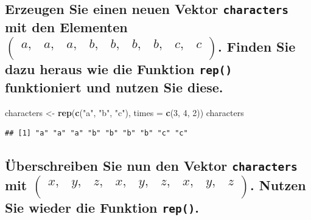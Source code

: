 \documentclass[12pt,a4paper]{article}
\newenvironment{Shaded}{\begin{snugshade}}{\end{snugshade}}
\newcommand{\AttributeTok}[1]{\textcolor[rgb]{0.13,0.29,0.53}{#1}}
\newcommand{\DecValTok}[1]{\textcolor[rgb]{0.00,0.00,0.81}{#1}}
\newcommand{\FunctionTok}[1]{\textcolor[rgb]{0.13,0.29,0.53}{\textbf{#1}}}
\newcommand{\NormalTok}[1]{#1}
\newcommand{\OtherTok}[1]{\textcolor[rgb]{0.56,0.35,0.01}{#1}}
\newcommand{\StringTok}[1]{\textcolor[rgb]{0.31,0.60,0.02}{#1}}
\begin{document}
\hypertarget{erzeugen-sie-einen-neuen-vektor-mit-den-elementen-beginpmatrix-a-a-a-b-b-b-b-c-c-endpmatrix.-finden-sie-dazu-heraus-wie-die-funktion-funktioniert-und-nutzen-sie-diese.}{%
\subsection{\texorpdfstring{Erzeugen Sie einen neuen Vektor
\texttt{characters} mit den Elementen
\(\begin{pmatrix} a, & a, & a, & b, & b, & b, & b, & c, & c \\ \end{pmatrix}\).
Finden Sie dazu heraus wie die Funktion \texttt{rep()} funktioniert und
nutzen Sie
diese.}{Erzeugen Sie einen neuen Vektor  mit den Elementen \textbackslash begin\{pmatrix\} a, \& a, \& a, \& b, \& b, \& b, \& b, \& c, \& c \textbackslash\textbackslash{} \textbackslash end\{pmatrix\}. Finden Sie dazu heraus wie die Funktion  funktioniert und nutzen Sie diese.}}\label{erzeugen-sie-einen-neuen-vektor-mit-den-elementen-beginpmatrix-a-a-a-b-b-b-b-c-c-endpmatrix.-finden-sie-dazu-heraus-wie-die-funktion-funktioniert-und-nutzen-sie-diese.}}

\begin{Shaded}
\begin{Highlighting}[]
\NormalTok{    characters }\OtherTok{\textless{}{-}} \FunctionTok{rep}\NormalTok{(}\FunctionTok{c}\NormalTok{(}\StringTok{"a"}\NormalTok{, }\StringTok{"b"}\NormalTok{, }\StringTok{"c"}\NormalTok{), }\AttributeTok{times =} \FunctionTok{c}\NormalTok{(}\DecValTok{3}\NormalTok{, }\DecValTok{4}\NormalTok{, }\DecValTok{2}\NormalTok{))}
\NormalTok{    characters}
\end{Highlighting}
\end{Shaded}

\begin{verbatim}
## [1] "a" "a" "a" "b" "b" "b" "b" "c" "c"
\end{verbatim}

\vspace{0.5cm}

\hypertarget{uxfcberschreiben-sie-nun-den-vektor-mit-beginpmatrix-x-y-z-x-y-z-x-y-z-endpmatrix.-nutzen-sie-wieder-die-funktion-.}{%
\subsection{\texorpdfstring{Überschreiben Sie nun den Vektor
\texttt{characters} mit
\linebreak  \(\begin{pmatrix} x, & y, & z, & x, & y, & z, & x, & y, & z \\ \end{pmatrix}\).
Nutzen Sie wieder die Funktion
\texttt{rep()}.}{Überschreiben Sie nun den Vektor  mit \textbackslash begin\{pmatrix\} x, \& y, \& z, \& x, \& y, \& z, \& x, \& y, \& z \textbackslash\textbackslash{} \textbackslash end\{pmatrix\}. Nutzen Sie wieder die Funktion .}}\label{uxfcberschreiben-sie-nun-den-vektor-mit-beginpmatrix-x-y-z-x-y-z-x-y-z-endpmatrix.-nutzen-sie-wieder-die-funktion-.}}
\end{document}
